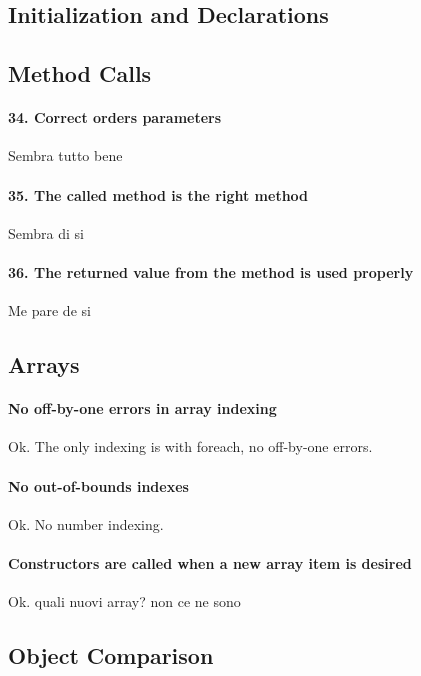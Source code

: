\documentclass[english]{article}
\begin{document}
\subsection{Initialization and Declarations}


\subsection{Method Calls}

\paragraph{34. Correct orders parameters}

Sembra tutto bene

\paragraph{35. The called method is the right method}

Sembra di si

\paragraph{36. The returned value from the method is used properly}

Me pare de si


\subsection{Arrays}
\paragraph{No off-by-one errors in array indexing}
Ok.
The only indexing is with foreach, no off-by-one errors.

\paragraph{No out-of-bounds indexes}
Ok.
No number indexing.

\paragraph{Constructors are called when a new array item is desired}
Ok.
quali nuovi array? non ce ne sono

\subsection{Object Comparison}
\end{document}
